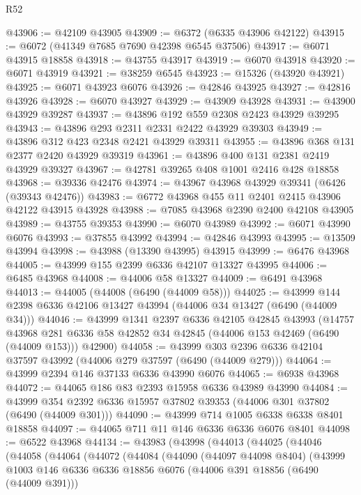 \begin{lexlean}{R52}
\begin{coremodule}
@43906 := @42109 @43905
@43909 := @6372 (@6335 @43906 @42122)
@43915 := @6072 (@41349 @7685 @7690 @42398 @6545 @37506)
@43917 := @6071 @43915 @18858
@43918 := @43755 @43917
@43919 := @6070 @43918
@43920 := @6071 @43919
@43921 := @38259 @6545
@43923 := @15326 (@43920 @43921)
@43925 := @6071 @43923 @6076
@43926 := @42846 @43925
@43927 := @42816 @43926
@43928 := @6070 @43927
@43929 := @43909 @43928
@43931 := @43900 @43929 @39287
@43937 := @43896 @192 @559 @2308 @2423 @43929 @39295
@43943 := @43896 @293 @2311 @2331 @2422 @43929 @39303
@43949 := @43896 @312 @423 @2348 @2421 @43929 @39311
@43955 := @43896 @368 @131 @2377 @2420 @43929 @39319
@43961 := @43896 @400 @131 @2381 @2419 @43929 @39327
@43967 := @42781 @39265 @408 @1001 @2416 @428 @18858
@43968 := @39336 @42476
@43974 := @43967 @43968 @43929 @39341 (@6426 (@39343 @42476))
@43983 := @6772 @43968 @455 @11 @2401 @2415 @43906 @42122 @43915 @43928
@43988 := @7085 @43968 @2390 @2400 @42108 @43905
@43989 := @43755 @39353
@43990 := @6070 @43989
@43992 := @6071 @43990 @6076
@43993 := @37855 @43992
@43994 := @42846 @43993
@43995 := @13509 @43994
@43998 := @43988 (@13390 @43995) @43915
@43999 := @6476 @43968
@44005 := @43999 @155 @2399 @6336 @42107 @13327 @43995
@44006 := @6485 @43968
@44008 := @44006 @58 @13327
@44009 := @6491 @43968
@44013 := @44005 (@44008 (@6490 (@44009 @58)))
@44025 := @43999 @144 @2398 @6336 @42106 @13427 @43994 (@44006 @34 @13427 (@6490 (@44009 @34)))
@44046 := @43999
    @1341
    @2397
    @6336
    @42105
    @42845
    @43993
    (@14757
      @43968
      @281
      @6336
      @58
      @42852
      @34
      @42845
      (@44006 @153 @42469 (@6490 (@44009 @153)))
      @42900)
@44058 := @43999 @303 @2396 @6336 @42104 @37597 @43992 (@44006 @279 @37597 (@6490 (@44009 @279)))
@44064 := @43999 @2394 @146 @37133 @6336 @43990 @6076
@44065 := @6938 @43968
@44072 := @44065 @186 @83 @2393 @15958 @6336 @43989 @43990
@44084 := @43999 @354 @2392 @6336 @15957 @37802 @39353 (@44006 @301 @37802 (@6490 (@44009 @301)))
@44090 := @43999 @714 @1005 @6338 @6338 @8401 @18858
@44097 := @44065 @711 @11 @146 @6336 @6336 @6076 @8401
@44098 := @6522 @43968
@44134 := @43983
    (@43998
      (@44013
        (@44025
          (@44046
            (@44058
              (@44064
                (@44072
                  (@44084
                    (@44090
                      (@44097 @44098 @8404)
                      (@43999
                        @1003
                        @146
                        @6336
                        @6336
                        @18856
                        @6076
                        (@44006 @391 @18856 (@6490 (@44009 @391)))

\end{coremodule}
\end{lexlean}

